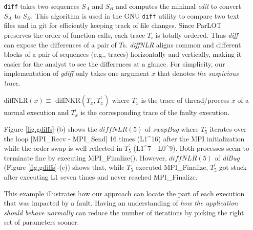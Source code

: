 \texttt{diff} takes two sequences $S_A$ and $S_B$ and computes the minimal \textit{edit} to convert $S_A$ to $S_B$. This algorithm is used in the GNU \texttt{diff} utility to compare two text files and in git for efficiently keeping track of file changes.
Since ParLOT preserves the order of function calls, each trace $T_i$ is totally ordered. Thus \textit{diff} can expose the differences of a pair of $T$s. \textit{diffNLR} aligns common and different blocks of a pair of sequences (e.g., traces) horizontally and vertically, making it easier for the analyst to see the differences at a glance.
For simplicity, our implementation of \textit{gdiff} only takes one argument $x$ that denotes \textit{the suspicious trace}.

diffNLR$(x) \equiv $ diffNKR$(T_x,T_x^\prime)$
%
where $T_x$ is the trace of thread/process $x$ of a normal execution and $T^\prime_x$ is the corresponding trace of the faulty execution.

Figure \ref{fig.gdiffs}-(b) shows the $diffNLR(5)$ of \textit{swapBug} where $T_5$ iterates over the loop [MPI\_Recv - MPI\_Send] 16 times (L1\^{}16) after the MPI initialization while the order swap is well reflected in $T_5^\prime$ (L1\^{}7 - L0\^{}9). Both processes seem to terminate fine by executing MPI\_Finalize(). 
However, $diffNLR(5)$ of \textit{dlBug} (Figure \ref{fig.gdiffs}-(c)) shows that, while $T_5$ executed MPI\_Finalize, $T_5^\prime$ got stuck after executing L1 seven times and never reached MPI\_Finalize.

This example illustrates how our approach can locate the part of each execution that was impacted by a fault. Having an understanding of \textit{how the application should behave normally} can reduce the number of iterations by picking the right set of parameters sooner. 








